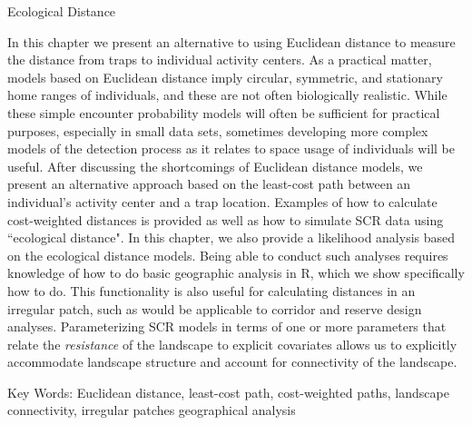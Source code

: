 Ecological Distance

In this chapter we present an alternative to using
Euclidean distance to measure the distance from traps to
individual activity centers.
As a practical matter, models based on Euclidean
distance imply circular, symmetric, and stationary home ranges of
individuals, and these are not often biologically realistic.  While
these simple encounter probability models will often be sufficient for
practical purposes, especially in small data sets, sometimes
developing more complex models of the detection process as it relates
to space usage of individuals will be useful. After discussing the shortcomings
of Euclidean distance models, we present an alternative approach based
on the least-cost path between an individual's activity center and a
trap location. Examples of how to calculate cost-weighted distances is provided
as well as how to simulate SCR data using ``ecological distance".  In this chapter,
we also provide a likelihood analysis based on the ecological distance models.  
Being able to conduct such analyses requires knowledge of how to do basic 
geographic analysis in R, which we show specifically how to do.  This 
functionality is also useful for calculating distances in an irregular patch, such as
would be applicable to corridor and reserve design analyses.
Parameterizing SCR models in terms of one or more
parameters that relate the {\it resistance} of the landscape to
explicit covariates allows us to explicitly accommodate
landscape structure and account for connectivity of the landscape. 

Key Words:  Euclidean distance, least-cost path, cost-weighted paths, landscape connectivity, irregular patches
geographical analysis